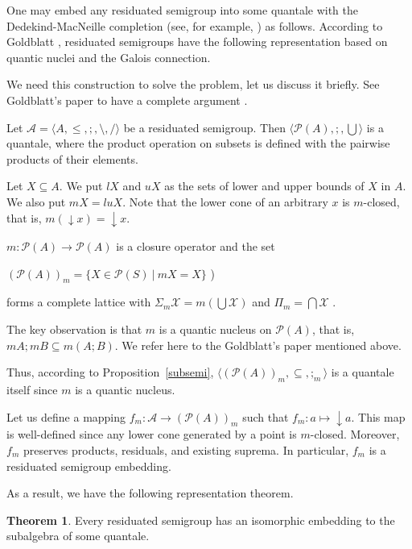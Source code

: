 \documentclass[a4paper]{article}
\theoremstyle{definition}
\theoremstyle{theorem}
\newtheorem{theorem}{Theorem}
\theoremstyle{proposition}
\theoremstyle{lemma}
\theoremstyle{ex}
\theoremstyle{corollary}
\theoremstyle{claim}
\begin{document}
One may embed any residuated semigroup into some quantale with the Dedekind-MacNeille completion (see, for example, \cite{theunissen2007macneille}) as follows. According to Goldblatt \cite{goldblatt2006kripke}, residuated semigroups have the following representation based on quantic nuclei and the Galois connection.

We need this construction to solve the problem, let us discuss it briefly. See Goldblatt's paper to have a complete argument \cite{goldblatt2006kripke}.

Let $\mathcal{A} = \langle A, \leq, ;, \setminus, / \rangle$ be a residuated semigroup. Then $\langle \mathcal{P}(A), ;, \bigcup \rangle$ is a quantale, where the product operation on subsets is defined with the pairwise products of their elements.

Let $X \subseteq A$. We put $lX$ and $uX$ as the sets of lower and upper bounds of $X$ in $A$. We also put $m X = lu X$.
Note that the lower cone of an arbitrary $x$ is $m$-closed, that is,
$m (\downarrow x) = \downarrow x$.

$m : \mathcal{P}(A) \to \mathcal{P}(A)$ is a closure operator and the set

\begin{center}
$(\mathcal{P}(A))_m = \{ X \in \mathcal{P}(S) \: | \: m X = X\}$ )
\end{center}
forms a complete lattice with $\Sigma_{m} \mathcal{X} = m ( \bigcup \mathcal{X})$ and $\Pi_{m} = \bigcap \mathcal{X}$ \cite{davey2002introduction}.

The key observation is that $m$ is a quantic nucleus on $\mathcal{P}(A)$, that is, $m A ; m B \subseteq m (A ; B)$. We refer here to the Goldblatt's paper mentioned above.

Thus, according to Proposition~\ref{subsemi}, $\langle (\mathcal{P}(A))_m, \subseteq, ;_m \rangle$ is a quantale itself since $m$ is a quantic nucleus.

Let us define a mapping $f_m : \mathcal{A} \to (\mathcal{P}(A))_m$ such that $f_m : a \mapsto \downarrow a$. This map is well-defined since any lower cone generated by a point is $m$-closed. Moreover, $f_m$ preserves products, residuals, and existing suprema. In particular, $f_m$ is a residuated semigroup embedding.

As a result, we have the following representation theorem.

\begin{theorem} \label{orsRep}
  Every residuated semigroup has an isomorphic embedding to the subalgebra of some quantale.
\end{theorem}
\end{document}
